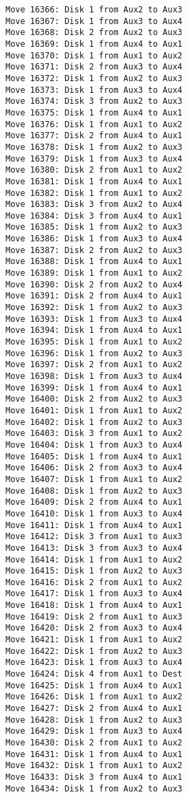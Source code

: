 \documentclass[11pt]{article}
\begin{document}
\begin{multicols}{2}
\begin{Verbatim}[fontsize=\small]
Move 16366: Disk 1 from Aux2 to Aux3
Move 16367: Disk 1 from Aux3 to Aux4
Move 16368: Disk 2 from Aux2 to Aux3
Move 16369: Disk 1 from Aux4 to Aux1
Move 16370: Disk 1 from Aux1 to Aux2
Move 16371: Disk 2 from Aux3 to Aux4
Move 16372: Disk 1 from Aux2 to Aux3
Move 16373: Disk 1 from Aux3 to Aux4
Move 16374: Disk 3 from Aux2 to Aux3
Move 16375: Disk 1 from Aux4 to Aux1
Move 16376: Disk 1 from Aux1 to Aux2
Move 16377: Disk 2 from Aux4 to Aux1
Move 16378: Disk 1 from Aux2 to Aux3
Move 16379: Disk 1 from Aux3 to Aux4
Move 16380: Disk 2 from Aux1 to Aux2
Move 16381: Disk 1 from Aux4 to Aux1
Move 16382: Disk 1 from Aux1 to Aux2
Move 16383: Disk 3 from Aux2 to Aux4
Move 16384: Disk 3 from Aux4 to Aux1
Move 16385: Disk 1 from Aux2 to Aux3
Move 16386: Disk 1 from Aux3 to Aux4
Move 16387: Disk 2 from Aux2 to Aux3
Move 16388: Disk 1 from Aux4 to Aux1
Move 16389: Disk 1 from Aux1 to Aux2
Move 16390: Disk 2 from Aux2 to Aux4
Move 16391: Disk 2 from Aux4 to Aux1
Move 16392: Disk 1 from Aux2 to Aux3
Move 16393: Disk 1 from Aux3 to Aux4
Move 16394: Disk 1 from Aux4 to Aux1
Move 16395: Disk 1 from Aux1 to Aux2
Move 16396: Disk 1 from Aux2 to Aux3
Move 16397: Disk 2 from Aux1 to Aux2
Move 16398: Disk 1 from Aux3 to Aux4
Move 16399: Disk 1 from Aux4 to Aux1
Move 16400: Disk 2 from Aux2 to Aux3
Move 16401: Disk 1 from Aux1 to Aux2
Move 16402: Disk 1 from Aux2 to Aux3
Move 16403: Disk 3 from Aux1 to Aux2
Move 16404: Disk 1 from Aux3 to Aux4
Move 16405: Disk 1 from Aux4 to Aux1
Move 16406: Disk 2 from Aux3 to Aux4
Move 16407: Disk 1 from Aux1 to Aux2
Move 16408: Disk 1 from Aux2 to Aux3
Move 16409: Disk 2 from Aux4 to Aux1
Move 16410: Disk 1 from Aux3 to Aux4
Move 16411: Disk 1 from Aux4 to Aux1
Move 16412: Disk 3 from Aux1 to Aux3
Move 16413: Disk 3 from Aux3 to Aux4
Move 16414: Disk 1 from Aux1 to Aux2
Move 16415: Disk 1 from Aux2 to Aux3
Move 16416: Disk 2 from Aux1 to Aux2
Move 16417: Disk 1 from Aux3 to Aux4
Move 16418: Disk 1 from Aux4 to Aux1
Move 16419: Disk 2 from Aux1 to Aux3
Move 16420: Disk 2 from Aux3 to Aux4
Move 16421: Disk 1 from Aux1 to Aux2
Move 16422: Disk 1 from Aux2 to Aux3
Move 16423: Disk 1 from Aux3 to Aux4
Move 16424: Disk 4 from Aux1 to Dest
Move 16425: Disk 1 from Aux4 to Aux1
Move 16426: Disk 1 from Aux1 to Aux2
Move 16427: Disk 2 from Aux4 to Aux1
Move 16428: Disk 1 from Aux2 to Aux3
Move 16429: Disk 1 from Aux3 to Aux4
Move 16430: Disk 2 from Aux1 to Aux2
Move 16431: Disk 1 from Aux4 to Aux1
Move 16432: Disk 1 from Aux1 to Aux2
Move 16433: Disk 3 from Aux4 to Aux1
Move 16434: Disk 1 from Aux2 to Aux3

\end{Verbatim}
\end{multicols}
\end{document}

